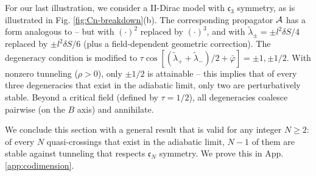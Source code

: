 \documentclass[aps, prb, showpacs, twocolumn, notitlepage, superscriptaddress]{revtex4-1}
\begin{document}









For our last illustration, we consider a II-Dirac model with $\mathfrak{c}_3$  symmetry, as   is illustrated in Fig. \ref{fig:Cn-breakdown}(b). The corresponding propagator ${\cal A}$ has a form analogous to  -- but with $(\cdot)^2$ replaced by $(\cdot)^3$, and with $\tilde{\lambda}_\pm{=}\pm l^2\delta S/4$ replaced by $\pm l^2\delta S/6$ (plus a field-dependent geometric correction). The degeneracy condition is  modified to $\tau\cos[(\tilde{\lambda}_+{+}\tilde{\lambda}_-)/2{+}\bar{\varphi}]{=}{\pm} 1,{\pm} 1/2$. With nonzero tunneling ($\rho {>}0$), only $\pm 1/2$ is attainable -- this implies that of every three degeneracies that exist in the adiabatic limit, only two are perturbatively stable. Beyond a critical field  (defined by $\tau{=}1/2$),   all degeneracies coalesce pairwise (on the $B$ axis) and annihilate. 

We conclude this section with a general result that is valid for any integer $N{\geq}2$: of every $N$ quasi-crossings that exist in the adiabatic limit, $N{-}1$ of them are stable against tunneling that respects  $\mathfrak{c}_N$ symmetry. We prove this in App. \ref{app:codimension}.


\end{document}
